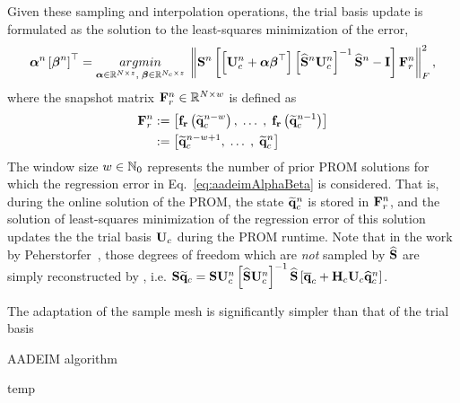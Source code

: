Given these sampling and interpolation operations, the trial basis update is formulated as the solution to the least-squares minimization of the error,
%
\begin{equation}\label{eq:aadeimAlphaBeta}
	\adeimAlpha^{\timeIdx} \left[\adeimBeta^{\timeIdx}\right]^\top = \argmin{\adeimAlpha \inRTwo{\numDOF}{\numRank},\; \adeimBeta \inRTwo{\numConsModes}{\numRank}} \left\Vert \sampMat^{\timeIdx} \left[\left[\consTrial^{\timeIdx} + \adeimAlpha \adeimBeta^\top \right] \left[\sampMatInterp^{\timeIdx} \consTrial^{\timeIdx}\right]^{-1} \sampMatInterp^{\timeIdx} - \identMat \right] \resWindow^{\timeIdx} \right\Vert_F^2,
\end{equation}
%
where the snapshot matrix $\resWindow^{\timeIdx} \inRTwo{\numDOF}{\numWindow}$ is defined as
%
\begin{align}
	\resWindow^{\timeIdx} &\defEq \left[\rhsResFunc{\consVecRom^{\timeIdx - \numWindow}}, \; \hdots \;, \; \rhsResFunc{\consVecRom^{\timeIdx - 1}}\right] \\
	&\defEq \left[\consVecRom^{\timeIdx - \numWindow + 1}, \; \hdots \;, \; \consVecRom^{\timeIdx} \right]
\end{align}
%
The window size $w \in \mathbb{N}_0$ represents the number of prior PROM solutions for which the regression error in Eq.~\ref{eq:aadeimAlphaBeta} is considered. That is, during the online solution of the PROM, the state $\mathbf{\widetilde{q}}_{c}^{n}$ is stored in $\resWindow^{\timeIdx}$, and the solution of least-squares minimization of the regression error of this solution updates the the trial basis $\consTrial$ during the PROM runtime. Note that in the work by Peherstorfer~\cite{Peherstorfer2020Adaptive}, those degrees of freedom which are \textit{not} sampled by $\mathbf{\widehat{S}}$ are simply reconstructed by , i.e. $\sampMat \consVecRom = \sampMat \consTrial^{\timeIdx} \left[\sampMatInterp \consTrial^{\timeIdx}\right]^{-1} \sampMatInterp \left[\consVecCent + \consScale \consTrial \consVecCoef^{\timeIdx}\right]$.

The adaptation of the sample mesh is significantly simpler than that of the trial basis

\begin{algorithm}
	\caption{AADEIM algorithm}\label{alg:aadeim}
	\begin{algorithmic}
		\STATE temp
	\end{algorithmic}
\end{algorithm}

